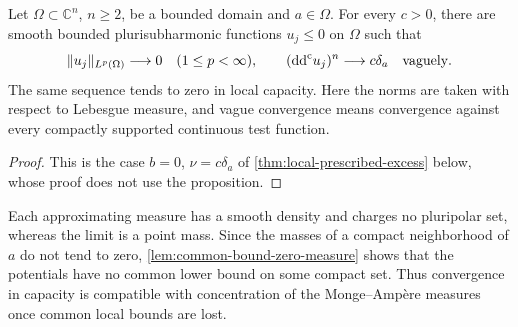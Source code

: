 \begin{proposition}\label{prop:smooth-dirac-concentration}
Let $\Omega\subset\mathbb C^n$, $n\geq2$, be a bounded domain and $a\in\Omega$. For every $c>0$, there are smooth bounded plurisubharmonic functions $u_j\leq0$ on $\Omega$ such that
\[
 \|u_j\|_{L^p(\Omega)}\longrightarrow0\quad(1\leq p<\infty),
 \qquad (\mathrm{dd}^{\mathrm{c}} u_j)^n\longrightarrow c\delta_a
 \quad\text{vaguely}.
\]
The same sequence tends to zero in local capacity. Here the norms are taken with respect to Lebesgue measure, and vague convergence means convergence against every compactly supported continuous test function.
\end{proposition}
\begin{proof}
This is the case $b=0$, $\nu=c\delta_a$ of \cref{thm:local-prescribed-excess} below, whose proof does not use the proposition.
\end{proof}

Each approximating measure has a smooth density and charges no pluripolar set, whereas the limit is a point mass. Since the masses of a compact neighborhood of $a$ do not tend to zero, \cref{lem:common-bound-zero-measure} shows that the potentials have no common lower bound on some compact set. Thus convergence in capacity is compatible with concentration of the Monge--Amp\`ere measures once common local bounds are lost.
